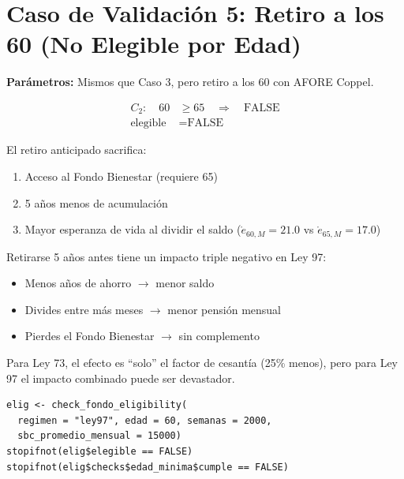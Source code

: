 \documentclass[11pt,a4paper]{report}
\theoremstyle{remark}
\begin{document}
\section{Caso de Validaci\'on 5: Retiro a los 60 (No Elegible por Edad)}

\begin{tcolorbox}[colback=blue!5!white, colframe=blue!75!black, title=\textbf{Definici\'on Formal}]
\textbf{Par\'ametros:} Mismos que Caso 3, pero retiro a los 60 con AFORE Coppel.

\begin{align}
C_2: \quad 60 &\geq 65 \quad \Rightarrow \quad \text{FALSE} \\
\text{elegible} &= \text{FALSE}
\end{align}

El retiro anticipado sacrifica:
\begin{enumerate}
  \item Acceso al Fondo Bienestar (requiere 65)
  \item 5 a\~nos menos de acumulaci\'on
  \item Mayor esperanza de vida al dividir el saldo ($\mathring{e}_{60,M} = 21.0$ vs $\mathring{e}_{65,M} = 17.0$)
\end{enumerate}
\end{tcolorbox}

\begin{tcolorbox}[colback=green!5!white, colframe=green!50!black, title=\textbf{Intuici\'on}]
Retirarse 5 a\~nos antes tiene un impacto triple negativo en Ley 97:
\begin{itemize}
  \item Menos a\~nos de ahorro $\to$ menor saldo
  \item Divides entre m\'as meses $\to$ menor pensi\'on mensual
  \item Pierdes el Fondo Bienestar $\to$ sin complemento
\end{itemize}

Para Ley 73, el efecto es ``solo'' el factor de cesant\'ia (25\% menos), pero para Ley 97 el impacto combinado puede ser devastador.
\end{tcolorbox}

\begin{tcolorbox}[colback=orange!5!white, colframe=orange!75!black, title=\textbf{Aplicaci\'on en C\'odigo}]
\begin{lstlisting}
elig <- check_fondo_eligibility(
  regimen = "ley97", edad = 60, semanas = 2000,
  sbc_promedio_mensual = 15000)
stopifnot(elig$elegible == FALSE)
stopifnot(elig$checks$edad_minima$cumple == FALSE)
\end{lstlisting}
\end{tcolorbox}
\end{document}
